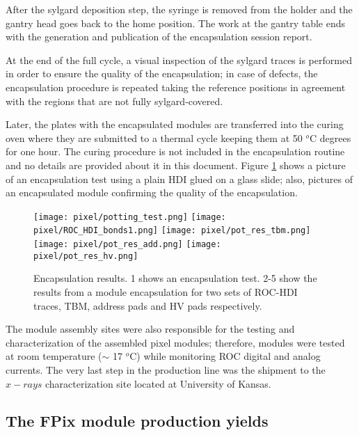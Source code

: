 After the sylgard deposition step, the syringe is removed from the holder and the gantry head goes back to the home position. The work at the gantry table ends with the generation and publication of the encapsulation session report.   

At the end of the full cycle, a visual inspection of the sylgard traces is performed in order to ensure the quality of the encapsulation; in case of defects, the encapsulation procedure is repeated taking the reference positions in agreement with the regions that are not fully sylgard-covered. 

Later, the plates with the encapsulated modules are transferred into the curing oven where they are submitted to a thermal cycle keeping them at 50 $^o$C degrees for one hour. The curing procedure is not included in the encapsulation routine and no details are provided about it in this document. Figure \ref{fig:potted_module} shows a picture of an encapsulation test using a plain HDI glued on a glass slide; also, pictures of an encapsulated module confirming the quality of the encapsulation.  

\begin{figure}[h]
\begin{center}
  \texttt{[image: pixel/potting\_test.png]}
  \texttt{[image: pixel/ROC\_HDI\_bonds1.png]}
  \texttt{[image: pixel/pot\_res\_tbm.png]}
  \texttt{[image: pixel/pot\_res\_add.png]}
  \texttt{[image: pixel/pot\_res\_hv.png]}
  \caption[Encapsulation results.]{Encapsulation results. 1 shows an encapsulation test. 2-5 show the results from a module encapsulation for two sets of ROC-HDI traces, TBM, address pads and HV pads respectively.}\label{fig:potted_module}
\end{center}
\end{figure}

The module assembly sites were also responsible for the testing and characterization of the assembled pixel modules; therefore, modules were tested at room temperature ($\sim$ 17 $^o$C) while monitoring ROC
digital and analog currents. The very last step in the production line was the shipment to the $x-rays$ characterization site located at University of Kansas.  

\subsection{The FPix module production yields}


